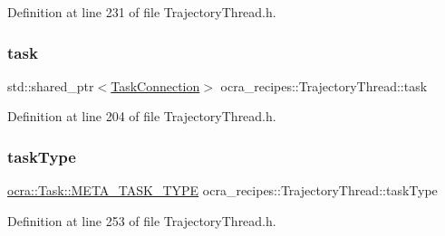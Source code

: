 Definition at line 231 of file Trajectory\+Thread.\+h.

\hypertarget{classocra__recipes_1_1TrajectoryThread_a3637e00b27ab63ecc48f813013626cba}{}\label{classocra__recipes_1_1TrajectoryThread_a3637e00b27ab63ecc48f813013626cba} 
\subsubsection{\texorpdfstring{task}{task}}
{\footnotesize\ttfamily std\+::shared\+\_\+ptr$<$\hyperlink{classocra__recipes_1_1TaskConnection}{Task\+Connection}$>$ ocra\+\_\+recipes\+::\+Trajectory\+Thread\+::task\hspace{0.3cm}{\ttfamily [protected]}}



Definition at line 204 of file Trajectory\+Thread.\+h.

\hypertarget{classocra__recipes_1_1TrajectoryThread_a97b08a2471b425e49525b51c9e8eabb4}{}\label{classocra__recipes_1_1TrajectoryThread_a97b08a2471b425e49525b51c9e8eabb4} 
\subsubsection{\texorpdfstring{task\+Type}{taskType}}
{\footnotesize\ttfamily \hyperlink{classocra_1_1Task_a8ddf2840d178ca273e886c9ca95248fe}{ocra\+::\+Task\+::\+M\+E\+T\+A\+\_\+\+T\+A\+S\+K\+\_\+\+T\+Y\+PE} ocra\+\_\+recipes\+::\+Trajectory\+Thread\+::task\+Type\hspace{0.3cm}{\ttfamily [protected]}}



Definition at line 253 of file Trajectory\+Thread.\+h.

\hypertarget{classocra__recipes_1_1TrajectoryThread_a3bbd0bd08a9ad023c025722486b1c118}{}\label{classocra__recipes_1_1TrajectoryThread_a3bbd0bd08a9ad023c025722486b1c118} 

